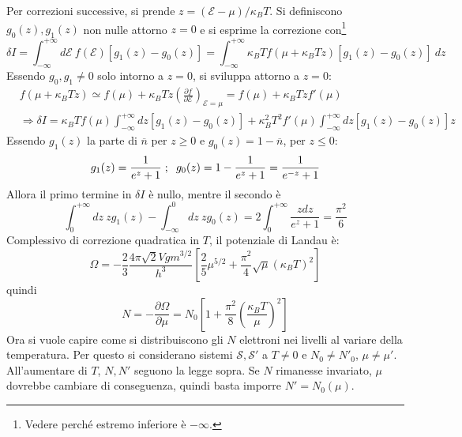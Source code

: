 \documentclass[10pt, a4paper]{scrartcl}
\numberwithin{equation}{subsection}
\theoremstyle{style1}
\begin{document}
Per correzioni successive, si prende $z = (\mathscr{E} - \mu ) / \kappa _B T $. Si definiscono $g_0(z), g_1(z)$ non nulle attorno $z=0$ e si esprime la correzione con\footnote{\color{red} Vedere perch\'e estremo inferiore \`e $-\infty$.}
\[
\delta I = \int_{-\infty} ^{+\infty} d \mathscr{E} \ f(\mathscr{E}) \left[ g_1(z) - g_0(z) \right] = \int_{-\infty} ^{+\infty} \kappa _B T f(\mu +\kappa _B T z) \left[ g_1(z) - g_0(z) \right]  \ dz
\] 
Essendo $g_0,g_1 \neq 0$ solo intorno a $z=0$, si sviluppa attorno a $z=0$:
\[
	\begin{split}
		&f(\mu  + \kappa _B T z) \simeq f(\mu ) + \kappa _B T z \left(\frac{\partial f}{\partial \mathscr{E}} \right) _{\mathscr{E} = \mu } = f(\mu ) + \kappa _B T zf '(\mu )\\
		& \Rightarrow \delta I = \kappa _B T f(\mu ) \int_{-\infty} ^{+\infty} dz \left[ g_1(z) - g_0(z) \right] + \kappa _B^2 T^2 f'(\mu ) \int_{-\infty} ^{+\infty} dz \left[ g_1(z) - g_0(z) \right] z
	\end{split}
\] 
Essendo $g_1(z)$ la parte di $\overline{n}$ per $z\ge 0$ e $g_0(z)=1 - \overline{n}$, per $z\le 0$:
\[
	g_1 (z) = \frac{1}{e^z +1} \hspace{.1cm} ; \hspace{.2cm} g_0(z) = 1 - \frac{1}{e^z +1} = \frac{1}{e^{-z}  +1}
\] 
Allora il primo termine in $\delta I$ \`e nullo, mentre il secondo \`e
\[
\int_{0} ^{+\infty} dz \ z g_1(z) - \int_{-\infty} ^0 dz \ z g_0(z) = 2 \int_{0} ^{+\infty} \frac{z dz}{e^z + 1}= \frac{\pi^2 }{6}
\] 
Complessivo di correzione quadratica in $T$, il potenziale di Landau \`e:
\begin{equation}
	\Omega = -\frac{2}{3} \frac{4 \pi \sqrt{2} V g m^{ 3 /2 } }{h^3}\left[ \frac{2}{5} \mu ^{5 / 2} + \frac{\pi^2 }{4} \sqrt{\mu } (\kappa _B  T )^2  \right] 
\end{equation}
quindi 
\begin{equation}
	N = - \frac{\partial \Omega }{\partial \mu } = N_0 \left[ 1 + \frac{\pi^2}{8} \left(\frac{\kappa _B T}{\mu }\right) ^2 \right] 
\end{equation}
Ora si vuole capire come si distribuiscono gli $N$ elettroni nei livelli al variare della temperatura. 
Per questo si considerano sistemi $\mathscr{S}, \mathscr{S}'$ a $T \neq 0$ e $N_0\neq N'_0$, $\mu  \neq \mu '$.
All'aumentare di $T$, $N,N'$ seguono la legge sopra. Se $N$ rimanesse invariato, $\mu $ dovrebbe cambiare di conseguenza, quindi basta imporre $N' = N_0(\mu )$. 
\end{document}
